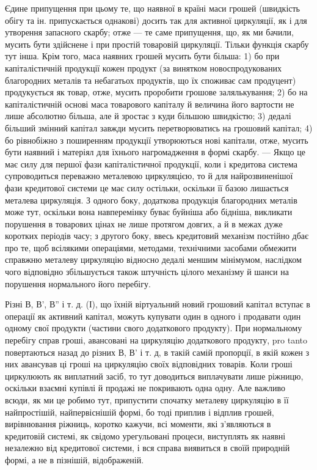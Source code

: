 Єдине припущення при цьому те, що наявної в країні маси грошей
(швидкість обігу та ін. припускається однакові) досить так для активної
циркуляції, як і для утворення запасного скарбу; отже — те саме припущення,
що, як ми бачили, мусить бути здійснене і при простій товаровій
циркуляції. Тільки функція скарбу тут інша. Крім того, маса наявних
грошей мусить бути більша: 1) бо при капіталістичній продукції
кожен продукт (за винятком новоспродукованих благородних металів та
небагатьох продуктів, що їх споживає сам продуцент) продукується як
товар, отже, мусить проробити грошове залялькування; 2) бо на капіталістичній
основі маса товарового капіталу й величина його вартости не
лише абсолютно більша, але й зростає з куди більшою швидкістю; 3) дедалі більший змінний капітал завжди мусить перетворюватись на
грошовий капітал; 4) бо рівнобіжно з поширенням продукції утворюються
нові капітали, отже, мусить бути наявний і матеріял для їхнього нагромадження
в формі скарбу. — Якщо це має силу для першої фази капіталістичної
продукції, коли і кредитова система супроводиться переважно
металевою циркуляцією, то й для найрозвиненішої фази кредитової
системи це має силу остільки, оскільки її базою лишається металева
циркуляція. З одного боку, додаткова продукція благородних металів
може тут, оскільки вона навперемінку буває буйніша або бідніша,
викликати порушення в товарових цінах не лише протягом довгих, а й
в межах дуже коротких періодів часу; з другого боку, ввесь кредитовий
механізм постійно дбає про те, щоб всілякими операціями, методами,
технічними засобами обмежити справжню металеву циркуляцію відносно
дедалі меншим мінімумом, наслідком чого відповідно збільшується також
штучність цілого механізму й шанси на порушення нормального його
перебігу.

Різні В, В', В'' і т. д. (І), що їхній віртуальний новий грошовий
капітал вступає в операції як активний капітал, можуть купувати один в одного
і продавати один одному свої продукти (частини свого додаткового
продукту). При нормальному перебігу справ гроші, авансовані на циркуляцію
додаткового продукту, pro tanto повертаються назад до різних
В, В' і т. д, в такій самій пропорції, в якій кожен з них авансував
ці гроші на циркуляцію своїх відповідних товарів. Коли гроші циркулюють
як виплатний засіб, то тут доводиться виплачувати лише ріжницю,
оскільки взаємні купівлі й продажі не покривають одна одну. Але важливо
всюди, як ми це робимо тут, припустити спочатку металеву циркуляцію
в її найпростішій, найпервіснішій формі, бо тоді приплив
і відплив грошей, вирівнювання ріжниць, коротко кажучи, всі моменти,
які з’являються в кредитовій системі, як свідомо урегульовані
процеси, виступлять як наявні незалежно від кредитової системи, і
вся справа виявиться в своїй природній формі, а не в пізнішій,
відображеній.

